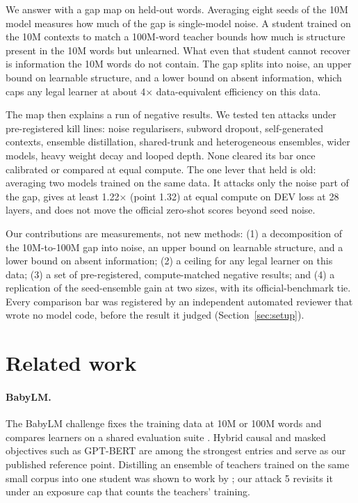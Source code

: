 \documentclass[11pt]{article}
\begin{document}
We answer with a gap map on held-out words. Averaging eight seeds of the 10M model measures how much of the gap is
single-model noise. A student trained on the 10M contexts to match a 100M-word teacher bounds how much is structure
present in the 10M words but unlearned. What even that student cannot recover is information the 10M words do not
contain. The gap splits into noise, an upper bound on learnable structure, and a lower bound on absent information,
which caps any legal learner at about 4$\times$ data-equivalent efficiency on this data.

The map then explains a run of negative results. We tested ten attacks under pre-registered kill lines: noise
regularisers, subword dropout, self-generated contexts, ensemble distillation, shared-trunk and heterogeneous ensembles,
wider models, heavy weight decay and looped depth. None cleared its bar once calibrated or compared at equal compute. The one
lever that held is old: averaging two models trained on the same data. It attacks only the noise part of the gap, gives
at least 1.22$\times$ (point 1.32) at equal compute on DEV loss at 28 layers, and does not move the official zero-shot scores beyond seed noise.

Our contributions are measurements, not new methods: (1) a decomposition of the 10M-to-100M gap into noise, an upper
bound on learnable structure, and a lower bound on absent information; (2) a ceiling for any legal learner on this data; (3) a set of
pre-registered, compute-matched negative results; and (4) a replication of the seed-ensemble gain at two sizes, with
its official-benchmark tie. Every comparison bar was registered by an independent automated reviewer that wrote no
model code, before the result it judged (Section~\ref{sec:setup}).

\section{Related work}
\label{sec:related}
\paragraph{BabyLM.} The BabyLM challenge fixes the training data at 10M or 100M words and compares learners on a shared
evaluation suite \citep{babylm2025}. Hybrid causal and masked objectives such as GPT-BERT \citep{charpentier2024gptbert}
are among the strongest entries and serve as our published reference point. Distilling an ensemble of teachers trained
on the same small corpus into one student was shown to work by \citet{timiryasov2023babyllama}; our attack 5 revisits
it under an exposure cap that counts the teachers' training.
\end{document}
